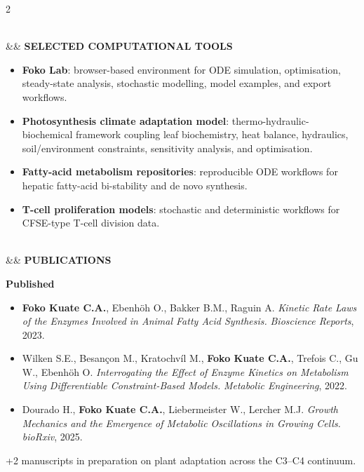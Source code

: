 \documentclass[10pt,a4paper]{article}
\newlength{\secbefore}   \setlength{\secbefore}{4.5pt}
\newlength{\secafter}    \setlength{\secafter}{2.5pt}
\newlength{\itemgap}     \setlength{\itemgap}{1.8pt}
\newlength{\pubitemgap}  \setlength{\pubitemgap}{3.0pt}
\newcommand{\cvsection}[2][]{%
    \vspace{\secbefore}%
    \noindent{\color{teal}\rule{\linewidth}{1.5pt}}\\[2pt]%
    \noindent%
    \ifx&#1&\else{\normalsize\color{teal}#1\enspace}\fi%
    {\normalsize\bfseries\color{ink}\MakeUppercase{#2}}%
    \par\vspace{\secafter}%
}
\begin{document}
\begin{paracol}{2}
\begin{rightcolumn}
\cvsection[\faLaptop]{Selected Computational Tools}
\begin{itemize}[itemsep=\pubitemgap, topsep=\secafter]
\item {\small\textbf{Foko Lab}: browser-based environment for ODE simulation, optimisation, steady-state analysis, stochastic modelling, model examples, and export workflows.}
\item {\small\textbf{Photosynthesis climate adaptation model}: thermo-hydraulic-biochemical framework coupling leaf biochemistry, heat balance, hydraulics, soil/environment constraints, sensitivity analysis, and optimisation.}
\item {\small\textbf{Fatty-acid metabolism repositories}: reproducible ODE workflows for hepatic fatty-acid bi-stability and de novo synthesis.}
\item {\small\textbf{T-cell proliferation models}: stochastic and deterministic workflows for CFSE-type T-cell division data.}
\end{itemize}

\cvsection[\faBook]{Publications}
{\small\bfseries\color{ink}Published}
\begin{itemize}[itemsep=\pubitemgap, topsep=\secafter]
\item {\small\justifying\textbf{Foko Kuate C.A.}, Ebenh\"oh O., Bakker B.M., Raguin A. \textit{Kinetic Rate Laws of the Enzymes Involved in Animal Fatty Acid Synthesis.} \textit{Bioscience Reports}, 2023.}
\item {\small\justifying Wilken S.E., Besan\c{c}on M., Kratochv\'il M., \textbf{Foko Kuate C.A.}, Trefois C., Gu W., Ebenh\"oh O. \textit{Interrogating the Effect of Enzyme Kinetics on Metabolism Using Differentiable Constraint-Based Models.} \textit{Metabolic Engineering}, 2022.}
\item {\small\justifying Dourado H., \textbf{Foko Kuate C.A.}, Liebermeister W., Lercher M.J. \textit{Growth Mechanics and the Emergence of Metabolic Oscillations in Growing Cells.} \textit{bioRxiv}, 2025.}
\end{itemize}

\vspace{3pt}
{\small\color{muted}+2 manuscripts in preparation on plant adaptation across the C3--C4 continuum.}

\end{rightcolumn}
\end{paracol}
\end{document}
